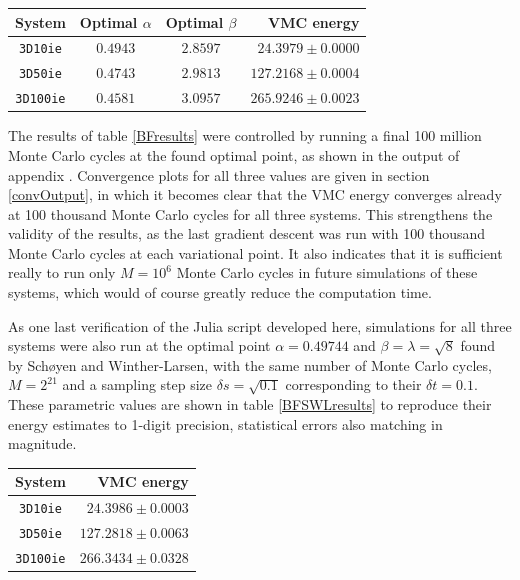 \documentclass[a4paper,8pt]{article}
\begin{document}
\begin{multicols}{2}
\begin{center}\small
{}
\label{BFresults}
\begin{tabular}{cccr}
	\hline\hline
	System & Optimal $\alpha$ & Optimal $\beta$ & VMC energy \\
	\hline
    \texttt{3D10ie} & $0.4943$ & $2.8597$ & $24.3979 \pm 0.0000$\\
    \texttt{3D50ie} & $0.4743$ & $2.9813$ & $127.2168 \pm 0.0004$\\
    \texttt{3D100ie} & $0.4581$ & $3.0957$ & $265.9246 \pm 0.0023$\\
    \hline\hline
\end{tabular}
\end{center}

The results of table \ref{BFresults} were controlled by running a final 100 million Monte Carlo cycles at the found optimal point, as shown in the output of appendix \label{output}. Convergence plots for all three values are given in section \ref{convOutput}, in which it becomes clear that the VMC energy converges already at 100 thousand Monte Carlo cycles for all three systems. This strengthens the validity of the results, as the last gradient descent was run with 100 thousand Monte Carlo cycles at each variational point. It also indicates that it is sufficient really to run only $M = 10^6$ Monte Carlo cycles in future simulations of these systems, which would of course greatly reduce the computation time.

As one last verification of the Julia script developed here, simulations for all three systems were also run at the optimal point ${\alpha = 0.49744}$ and ${\beta = \lambda = \sqrt{8}}$ found by Schøyen and Winther-Larsen, with the same number of Monte Carlo cycles, ${M = 2^21}$ and a sampling step size ${\delta s = \sqrt{0.1}}$ corresponding to their $\delta t = 0.1$. These parametric values are shown in table \ref{BFSWLresults} to reproduce their energy estimates to 1-digit precision, statistical errors also matching in magnitude.

\begin{center}\small
{}
\label{BFSWLresults}
\begin{tabular}{cr}
	\hline\hline
	System & VMC energy \\
	\hline
    \texttt{3D10ie} & $24.3986 \pm 0.0003$\\
    \texttt{3D50ie} & $127.2818 \pm 0.0063$\\
    \texttt{3D100ie} & $266.3434 \pm 0.0328$\\
    \hline\hline
\end{tabular}
\end{center}


\end{multicols}
\end{document}
